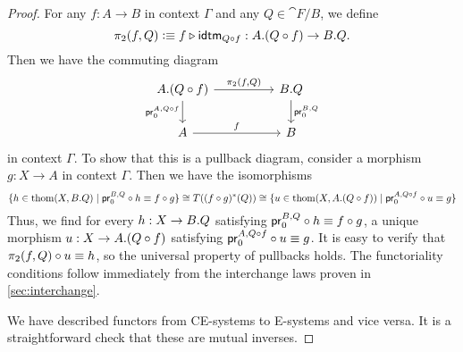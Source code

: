 \begin{proof}
For any $f:A\to B$ in context $\Gamma$ and any $Q\in\cat{F}/B$, we define
\begin{equation*}
\pi_2(f,Q)\defeq \jvcomp{\jcomp{A}{f}{Q}}{f}{\tfid{\jcomp{A}{f}{Q}}}
  : \ctxext{A}{\jcomp{A}{f}{Q}}\to\ctxext{B}{Q}.
\end{equation*}
Then we have the commuting diagram
\begin{equation*}
\begin{tikzcd}[column sep=huge]
\ctxext{A}{\jcomp{A}{f}{Q}} \arrow[r,"{\pi_2(f,Q)}"] \arrow[d,swap,"{\cprojfstf{A}{\jcomp{A}{f}{Q}}}"] & \ctxext{B}{Q} \arrow[d,"{\cprojfstf{B}{Q}}"] \\
A \arrow[r,"f"] & B
\end{tikzcd}
\end{equation*}
in context $\Gamma$. To show that this is a pullback diagram, consider a
morphism $g:X\to A$ in context $\Gamma$. Then we have the isomorphisms
\begin{equation*}
\{h\in\thom{X}{\ctxext{B}{Q}}\mid \jcomp{X}{h}{\cprojfstf{B}{Q}}\jdeq\jcomp{X}{g}{f}\}
  \cong
T((\jcomp{X}{g}{f})^\ast(Q))
  \cong
\{u\in\thom{X}{\ctxext{A}{\jcomp{A}{f}{Q}}}\mid\jcomp{X}{u}{\cprojfstf{A}{\jcomp{A}{f}{Q}}}\jdeq g\}
\end{equation*}
Thus, we find for every $h:X\to\ctxext{B}{Q}$ satisfying
$\jcomp{X}{h}{\cprojfstf{B}{Q}}\jdeq\jcomp{X}{g}{f}$, a unique morphism
$u:X\to\ctxext{A}{\jcomp{A}{f}{Q}}$ satisfying
$\jcomp{X}{u}{\cprojfstf{A}{\jcomp{A}{f}{Q}}}\jdeq g$. It is easy to verify
that $\jcomp{X}{u}{\pi_2(f,Q)}\jdeq h$, so the universal property of pullbacks
holds. The functoriality conditions follow immediately from the interchange
laws proven in \autoref{sec:interchange}.

We have described functors from CE-systems to E-systems and vice versa. It is
a straightforward check that these are mutual inverses.
\end{proof}

